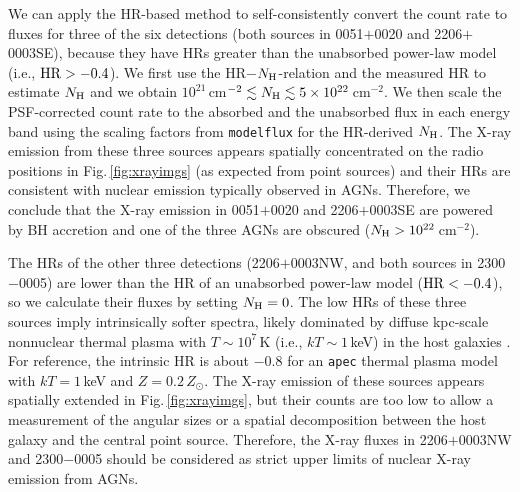 \documentclass[iop,revtex4,twocolumn,apj,numberedappendix,appendixfloats]{emulateapj}
\begin{document}
We can apply the HR-based method to self-consistently convert the count rate to fluxes for three of the six detections (both sources in 0051$+$0020 and 2206$+$0003SE), because they have HRs greater than the unabsorbed power-law model (i.e., ${\rm HR} > -0.4$). We first use the HR$-$$N_{\rm H}$-relation and the measured HR to estimate $N_{\rm H}$ and we obtain $10^{21}$\,cm$^{-2} \lesssim N_{\rm H} \lesssim 5\times10^{22}$\,cm$^{-2}$. We then scale the PSF-corrected count rate to the absorbed and the unabsorbed flux in each energy band using the scaling factors from \texttt{modelflux} for the HR-derived $N_{\rm H}$. The X-ray emission from these three sources appears spatially concentrated on the radio positions in Fig.\,\ref{fig:xrayimgs} (as expected from point sources) and their HRs are consistent with nuclear emission typically observed in AGNs. Therefore, we conclude that the X-ray emission in 0051$+$0020 and 2206$+$0003SE are powered by BH accretion and one of the three AGNs are obscured ($N_{\rm H} > 10^{22}$\,cm$^{-2}$).

The HRs of the other three detections (2206$+$0003NW, and both sources in 2300$-$0005) are lower than the HR of an unabsorbed power-law model (${\rm HR} < -0.4$), so we calculate their fluxes by setting $N_{\rm H} = 0$. The low HRs of these three sources imply intrinsically softer spectra, likely dominated by diffuse kpc-scale nonnuclear thermal plasma with $T \sim 10^7$\,K (i.e., $kT \sim 1$\,keV) in the host galaxies \citep[e.g.,][]{Donato04}. For reference, the intrinsic HR is about $-0.8$ for an \texttt{apec} thermal plasma model with $kT = 1$\,keV and $Z = 0.2\,Z_\odot$. The X-ray emission of these sources appears spatially extended in Fig.\,\ref{fig:xrayimgs}, but their counts are too low to allow a measurement of the angular sizes or a spatial decomposition between the host galaxy and the central point source. Therefore, the X-ray fluxes in 2206$+$0003NW and 2300$-$0005 should be considered as strict upper limits of nuclear X-ray emission from AGNs.
\end{document}
